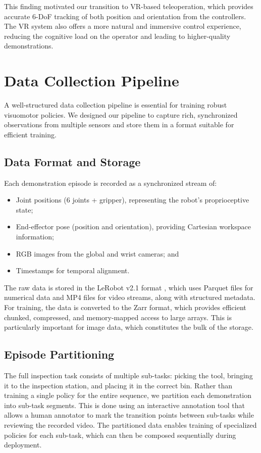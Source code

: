\documentclass[conference]{IEEEtran}
\begin{document}
This finding motivated our transition to VR-based teleoperation, which provides accurate 6-DoF tracking of both position and orientation from the controllers. The VR system also offers a more natural and immersive control experience, reducing the cognitive load on the operator and leading to higher-quality demonstrations.

\section{Data Collection Pipeline}

A well-structured data collection pipeline is essential for training robust visuomotor policies. We designed our pipeline to capture rich, synchronized observations from multiple sensors and store them in a format suitable for efficient training.

\subsection{Data Format and Storage}

Each demonstration episode is recorded as a synchronized stream of:
\begin{itemize}
    \item Joint positions (6 joints + gripper), representing the robot's proprioceptive state;
    \item End-effector pose (position and orientation), providing Cartesian workspace information;
    \item RGB images from the global and wrist cameras; and
    \item Timestamps for temporal alignment.
\end{itemize}

The raw data is stored in the LeRobot v2.1 format \cite{cadene2024lerobot}, which uses Parquet files for numerical data and MP4 files for video streams, along with structured metadata. For training, the data is converted to the Zarr format, which provides efficient chunked, compressed, and memory-mapped access to large arrays. This is particularly important for image data, which constitutes the bulk of the storage.

\subsection{Episode Partitioning}

The full inspection task consists of multiple sub-tasks: picking the tool, bringing it to the inspection station, and placing it in the correct bin. Rather than training a single policy for the entire sequence, we partition each demonstration into sub-task segments. This is done using an interactive annotation tool that allows a human annotator to mark the transition points between sub-tasks while reviewing the recorded video. The partitioned data enables training of specialized policies for each sub-task, which can then be composed sequentially during deployment.
\end{document}
